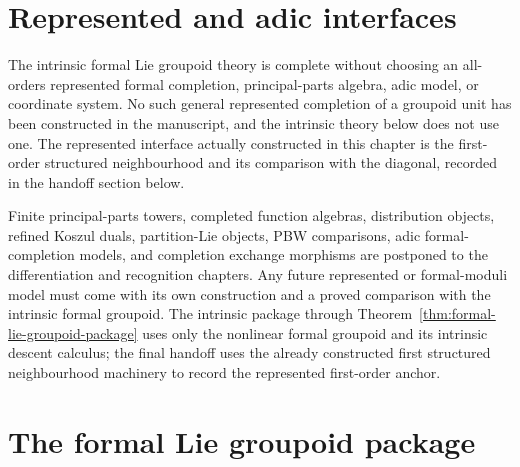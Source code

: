 \section{Represented and adic interfaces}
\label{sec:flg-represented-interface}


The intrinsic formal Lie groupoid theory is complete without choosing an
all-orders represented formal completion, principal-parts algebra, adic model,
or coordinate system.  No such general represented completion of a groupoid
unit has been constructed in the manuscript, and the intrinsic theory below
does not use one.
The represented interface actually constructed in this chapter is the
first-order structured neighbourhood and its comparison with the diagonal,
recorded in the handoff section below.

\begin{remark}
Finite principal-parts towers, completed function algebras, distribution
objects, refined Koszul duals, partition-Lie objects, PBW comparisons, adic
formal-completion models, and completion exchange morphisms are postponed to
the differentiation and recognition chapters.  Any future represented or
formal-moduli model must come with its own construction and a proved comparison
with the intrinsic formal groupoid.  The intrinsic package through
Theorem~\ref{thm:formal-lie-groupoid-package} uses only the nonlinear formal
groupoid and its intrinsic descent calculus; the final handoff uses the
already constructed first structured neighbourhood machinery to record the
represented first-order anchor.
\end{remark}


\section{The formal Lie groupoid package}
\label{sec:flg-synthesis}

